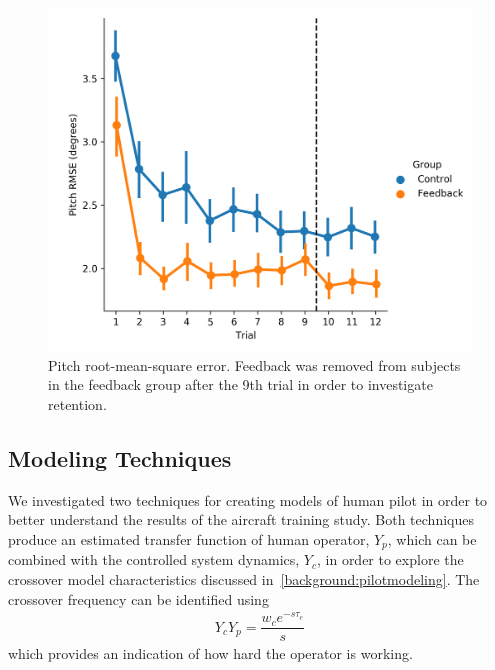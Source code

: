 \begin{figure}[t]
    \centering
    \includegraphics[width=0.8\linewidth]{figures/Modeling/prms_arx.png}
    \caption[Pitch root-mean-square error]{Pitch root-mean-square error. Feedback was removed from subjects in the feedback group after the 9th trial in order to investigate retention.}
    \label{fig:prmse}
\end{figure}

\subsection{Modeling Techniques}
We investigated two techniques for creating models of human pilot in order to better understand the results of the aircraft training study.
Both techniques produce an estimated transfer function of human operator, $Y_p$, which can be combined with the controlled system dynamics, $Y_c$, in order to explore the crossover model characteristics discussed in~\ref{background:pilotmodeling}.
The crossover frequency can be identified using
\begin{align}
    Y_c Y_p = \dfrac{w_c e^{-s \tau_e}}{s}
\end{align}
which provides an indication of how hard the operator is working.

